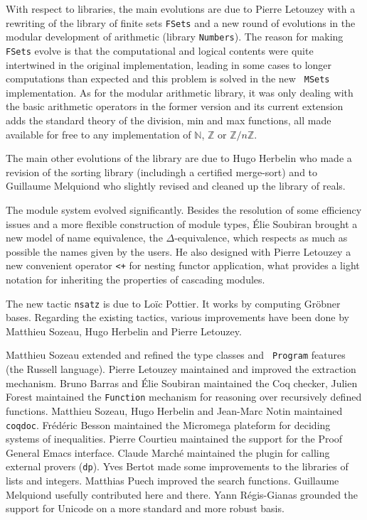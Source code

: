 With respect to libraries, the main evolutions are due to Pierre
Letouzey with a rewriting of the library of finite sets {\tt FSets}
and a new round of evolutions in the modular development of arithmetic
(library {\tt Numbers}). The reason for making {\tt FSets} evolve is
that the computational and logical contents were quite intertwined in
the original implementation, leading in some cases to longer
computations than expected and this problem is solved in the new {\tt
  MSets} implementation. As for the modular arithmetic library, it was
only dealing with the basic arithmetic operators in the former version
and its current extension adds the standard theory of the division,
min and max functions, all made available for free to any
implementation of $\mathbb{N}$, $\mathbb{Z}$ or
$\mathbb{Z}/n\mathbb{Z}$. 

The main other evolutions of the library are due to Hugo Herbelin who
made a revision of the sorting library (includingh a certified
merge-sort) and to Guillaume Melquiond who slightly revised and
cleaned up the library of reals.

The module system evolved significantly. Besides the resolution of
some efficiency issues and a more flexible construction of module
types, Élie Soubiran brought a new model of name equivalence, the
$\Delta$-equivalence, which respects as much as possible the names
given by the users. He also designed with Pierre Letouzey a new
convenient operator \verb!<+! for nesting functor application, what
provides a light notation for inheriting the properties of cascading
modules.

The new tactic {\tt nsatz} is due to Loïc Pottier. It works by
computing Gr\"obner bases. Regarding the existing tactics, various
improvements have been done by Matthieu Sozeau, Hugo Herbelin and
Pierre Letouzey.

Matthieu Sozeau extended and refined the type classes and {\tt
  Program} features (the {\sc Russell} language). Pierre Letouzey
maintained and improved the extraction mechanism.  Bruno Barras and
\'Elie Soubiran maintained the Coq checker, Julien Forest maintained
the {\tt Function} mechanism for reasoning over recursively defined
functions. Matthieu Sozeau, Hugo Herbelin and Jean-Marc Notin
maintained {\tt coqdoc}. Frédéric Besson maintained the {\sc
  Micromega} plateform for deciding systems of inequalities. Pierre
Courtieu maintained the support for the Proof General Emacs
interface. Claude Marché maintained the plugin for calling external
provers ({\tt dp}). Yves Bertot made some improvements to the
libraries of lists and integers. Matthias Puech improved the search
functions. Guillaume Melquiond usefully contributed here and
there. Yann Régis-Gianas grounded the support for Unicode on a more
standard and more robust basis.

